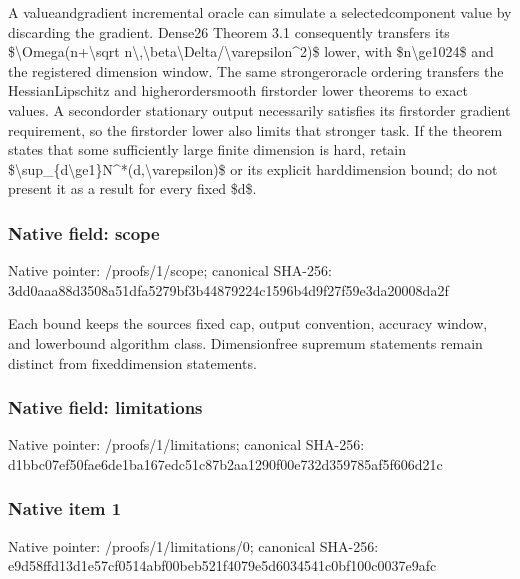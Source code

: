 \documentclass[10pt,a4paper]{article}
\begin{document}
A valueandgradient incremental oracle can simulate a selectedcomponent value by discarding the gradient. Dense26 Theorem 3.1 consequently transfers its \$\textbackslash{}Omega(n+\textbackslash{}sqrt n\textbackslash{},\textbackslash{}beta\textbackslash{}Delta/\textbackslash{}varepsilon\textasciicircum{}2)\$ lower, with \$n\textbackslash{}ge1024\$ and the registered dimension window. The same strongeroracle ordering transfers the HessianLipschitz and higherordersmooth firstorder lower theorems to exact values. A secondorder stationary output necessarily satisfies its firstorder gradient requirement, so the firstorder lower also limits that stronger task. If the theorem states that some sufficiently large finite dimension is hard, retain \$\textbackslash{}sup\_\{d\textbackslash{}ge1\}N\textasciicircum{}*(d,\textbackslash{}varepsilon)\$ or its explicit harddimension bound; do not present it as a result for every fixed \$d\$.


\subsubsection{Native field: scope}


Native pointer: /proofs/1/scope; canonical SHA-256: 3dd0aaa88d3508a51dfa5279\allowbreak{}bf3b44879224c1596b4d9f27\allowbreak{}f59e3da20008da2f


Each bound keeps the sources fixed cap, output convention, accuracy window, and lowerbound algorithm class. Dimensionfree supremum statements remain distinct from fixeddimension statements.


\subsubsection{Native field: limitations}


Native pointer: /proofs/1/limitations; canonical SHA-256: d1bbc07ef50fae6de1ba167e\allowbreak{}dc51c87b2aa1290f00e732d3\allowbreak{}59785af5f606d21c



\subsubsection{Native item 1}


Native pointer: /proofs/1/limitations/0; canonical SHA-256: e9d58ffd13d1e57cf0514abf\allowbreak{}00beb521f4079e5d6034541c\allowbreak{}0bf100c0037e9afc
\end{document}
